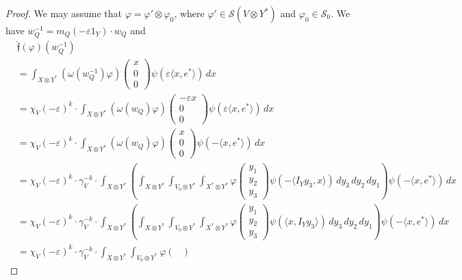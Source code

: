\documentclass[11pt]{amsart}
\numberwithin{equation}{section}
\theoremstyle{plain}
\theoremstyle{definition}
\theoremstyle{remark}
\def\s{\mathscr{S}}
\def\ff{\mathfrak{f}}
\begin{document}
\begin{proof}
We may assume that $\varphi = \varphi' \otimes \varphi_0$,
where $\varphi' \in \s(V \otimes Y^*)$ and $\varphi_0 \in \s_0$.
We have $w_Q^{-1} = m_Q(-\varepsilon 1_Y) \cdot w_Q$ and 
\begin{align*}
 & \hat{\ff}(\varphi)(w_Q^{-1}) \\
 & = \int_{X \otimes Y^*} (\omega(w_Q^{-1}) \varphi)
 \begin{pmatrix}
  x \\
  0 \\
  0
 \end{pmatrix}
 \psi(\varepsilon \langle x, e^* \rangle ) \, dx \\
 & = \chi_V(-\varepsilon)^k \cdot \int_{X \otimes Y^*} (\omega(w_Q) \varphi)
 \begin{pmatrix}
  -\varepsilon x \\
  0 \\
  0
 \end{pmatrix}
 \psi(\varepsilon \langle x, e^* \rangle ) \, dx \\
 & = \chi_V(-\varepsilon)^k \cdot \int_{X \otimes Y^*} (\omega(w_Q) \varphi)
 \begin{pmatrix}
  x \\
  0 \\
  0
 \end{pmatrix}
 \psi(- \langle x, e^* \rangle ) \, dx \\
 & = \chi_V(-\varepsilon)^k \cdot \gamma_V^{-k} \cdot \int_{X \otimes Y^*}
 \left( \int_{X \otimes Y^*} \int_{V_0 \otimes Y^*} \int_{X^* \otimes Y^*}
 \varphi
 \begin{pmatrix}
  y_1 \\
  y_2 \\
  y_3 
 \end{pmatrix} 
 \psi(-\langle I_Y y_3, x \rangle) \, dy_3 \, dy_2 \, dy_1 \right)  
 \psi(- \langle x, e^* \rangle ) \, dx \\
 & = \chi_V(-\varepsilon)^k \cdot \gamma_V^{-k} \cdot \int_{X \otimes Y^*}
 \left( \int_{X \otimes Y^*} \int_{V_0 \otimes Y^*} \int_{X^* \otimes Y^*}
 \varphi
 \begin{pmatrix}
  y_1 \\
  y_2 \\
  y_3 
 \end{pmatrix} 
 \psi(\langle x, I_Yy_3 \rangle) \, dy_3 \, dy_2 \, dy_1 \right)  
 \psi(- \langle x, e^* \rangle ) \, dx \\
 & = \chi_V(-\varepsilon)^k \cdot \gamma_V^{-k} \cdot \int_{X \otimes Y^*} \int_{V_0 \otimes Y^*} \varphi
 \begin{pmatrix}

\end{pmatrix}
\end{align*}
\end{proof}
\end{document}
